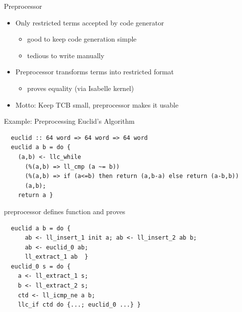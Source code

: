 \documentclass[fleqn]{beamer}
\begin{document}
\begin{frame}[fragile]{Preprocessor}
  \begin{itemize}
   \item Only restricted terms accepted by code generator
    \begin{itemize}
     \item good to keep code generation simple
     \item tedious to write manually
    \end{itemize}
   \item Preprocessor transforms terms into restricted format
    \begin{itemize}
     \item proves equality (via Isabelle kernel)
    \end{itemize}
   \item Motto: Keep TCB small, preprocessor makes it usable


  \end{itemize}
\end{frame}
\begin{frame}[fragile]{Example: Preprocessing Euclid's Algorithm}
  \small
  \begin{lstlisting}
  euclid :: 64 word => 64 word => 64 word
  euclid a b = do {
    (a,b) <- llc_while
      (%(a,b) => ll_cmp (a ~= b))
      (%(a,b) => if (a<=b) then return (a,b-a) else return (a-b,b))
      (a,b);
    return a }
  \end{lstlisting}
  \pause
  preprocessor defines function  and proves
  \begin{lstlisting}
  euclid a b = do {
      ab <- ll_insert_1 init a; ab <- ll_insert_2 ab b;
      ab <- euclid_0 ab;
      ll_extract_1 ab  }
  euclid_0 s = do {
    a <- ll_extract_1 s;
    b <- ll_extract_2 s;
    ctd <- ll_icmp_ne a b;
    llc_if ctd do {...; euclid_0 ...} }
  \end{lstlisting}


\end{frame}
\end{document}
